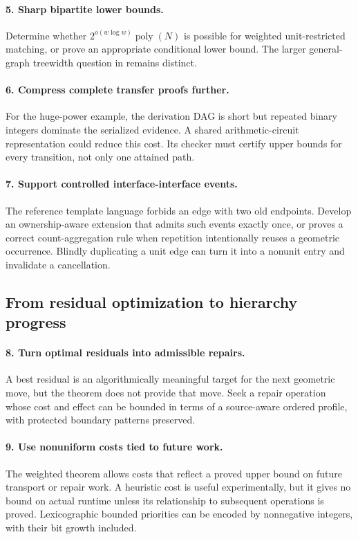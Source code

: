 \documentclass[11pt,a4paper]{article}
\theoremstyle{definition}
\theoremstyle{remark}
\begin{document}
\paragraph{5. Sharp bipartite lower bounds.}
Determine whether $2^{o(w\log w)}\operatorname{poly}(N)$ is possible for
weighted unit-restricted matching, or prove an appropriate conditional
lower bound. The larger general-graph treewidth question in
\cite{csz2025} remains distinct.

\paragraph{6. Compress complete transfer proofs further.}
For the huge-power example, the derivation DAG is short but repeated binary
integers dominate the serialized evidence. A shared arithmetic-circuit
representation could reduce this cost. Its checker must certify upper
bounds for every transition, not only one attained path.

\paragraph{7. Support controlled interface-interface events.}
The reference template language forbids an edge with two old endpoints.
Develop an ownership-aware extension that admits such events exactly once,
or proves a correct count-aggregation rule when repetition intentionally
reuses a geometric occurrence. Blindly duplicating a unit edge can turn it
into a nonunit entry and invalidate a cancellation.

\subsection{From residual optimization to hierarchy progress}
\paragraph{8. Turn optimal residuals into admissible repairs.}
A best residual is an algorithmically meaningful target for the next
geometric move, but the theorem does not provide that move. Seek a repair
operation whose cost and effect can be bounded in terms of a source-aware
ordered profile, with protected boundary patterns preserved.

\paragraph{9. Use nonuniform costs tied to future work.}
The weighted theorem allows costs that reflect a proved upper bound on
future transport or repair work. A heuristic cost is useful experimentally,
but it gives no bound on actual runtime unless its relationship to
subsequent operations is proved. Lexicographic bounded priorities can be
encoded by nonnegative integers, with their bit growth included.
\end{document}
